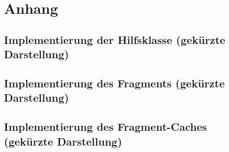 \appendix
\chapter{Anhang}
\section[Implementierung der Hilfsklasse]{Implementierung der Hilfsklasse (gekürzte Darstellung)}\label{sec:Hilfsklasse}
\newpage
\section[Implementierung des Fragments]{Implementierung des Fragments (gekürzte Darstellung)}\label{sec:Fragment}
\newpage
\section[Implementierung des Fragment-Caches]{Implementierung des Fragment-Caches (gekürzte Darstellung)}\label{sec:Cache}
